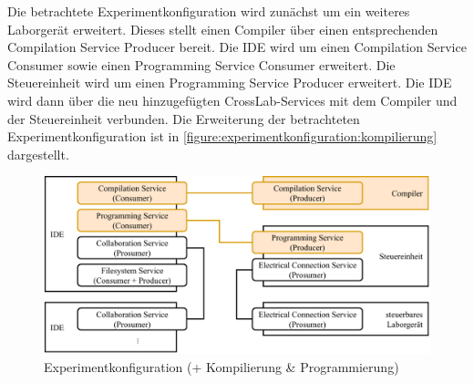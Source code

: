 Die betrachtete Experimentkonfiguration wird zunächst um ein weiteres Laborgerät erweitert. Dieses stellt einen Compiler über einen entsprechenden Compilation Service Producer bereit. Die IDE wird um einen Compilation Service Consumer sowie einen Programming Service Consumer erweitert. Die Steuereinheit wird um einen Programming Service Producer erweitert. Die IDE wird dann über die neu hinzugefügten CrossLab-Services mit dem Compiler und der Steuereinheit verbunden. Die Erweiterung der betrachteten Experimentkonfiguration ist in \autoref{figure:experimentkonfiguration:kompilierung} dargestellt.

\begin{figure}[tbp]
    \centering
    \includegraphics[width=\textwidth]{diagrams/experimentkonfigurationen/Experimentkonfiguration-03.drawio.pdf}
    \caption{Experimentkonfiguration (+ Kompilierung \& Programmierung)}
    \label{figure:experimentkonfiguration:kompilierung}
\end{figure}